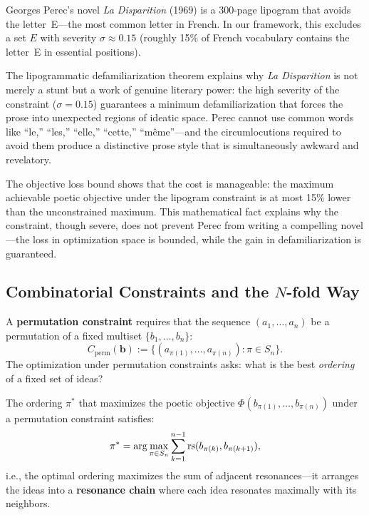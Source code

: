 \begin{interpretation}
\label{interp:lipogram}
Georges Perec's novel \textit{La Disparition} (1969) is a 300-page lipogram
that avoids the letter~E---the most common letter in French.  In our framework,
this excludes a set $E$ with severity $\sigma \approx 0.15$ (roughly 15\%
of French vocabulary contains the letter~E in essential positions).

The lipogrammatic defamiliarization theorem explains why \textit{La Disparition}
is not merely a stunt but a work of genuine literary power: the high severity
of the constraint ($\sigma = 0.15$) guarantees a minimum defamiliarization
that forces the prose into unexpected regions of ideatic space.  Perec cannot
use common words like ``le,'' ``les,'' ``elle,'' ``cette,'' ``m\^eme''---and
the circumlocutions required to avoid them produce a distinctive prose style
that is simultaneously awkward and revelatory.

The objective loss bound shows that the cost is manageable: the maximum
achievable poetic objective under the lipogram constraint is at most 15\%
lower than the unconstrained maximum.  This mathematical fact explains why
the constraint, though severe, does not prevent Perec from writing a
compelling novel---the loss in optimization space is bounded, while the
gain in defamiliarization is guaranteed.
\end{interpretation}

\subsection{Combinatorial Constraints and the $N$-fold Way}

\begin{definition}
\label{def:permutation-constraint}
A \textbf{permutation constraint} requires that the sequence
$(a_1, \ldots, a_n)$ be a permutation of a fixed multiset
$\{b_1, \ldots, b_n\}$:
\[
  C_{\text{perm}}(\mathbf{b}) :=
  \{(a_{\pi(1)}, \ldots, a_{\pi(n)}) : \pi \in S_n\}.
\]
The optimization under permutation constraints asks: what is the best
\emph{ordering} of a fixed set of ideas?
\end{definition}

\begin{theorem}
\label{thm:optimal-ordering}
The ordering $\pi^\ast$ that maximizes the poetic objective
$\Phi(b_{\pi(1)}, \ldots, b_{\pi(n)})$ under a permutation constraint
satisfies:
\[
  \pi^\ast = \arg\max_{\pi \in S_n}
  \sum_{k=1}^{n-1} \mathrm{rs}(b_{\pi(k)}, b_{\pi(k+1)}),
\]
i.e., the optimal ordering maximizes the sum of adjacent resonances---it
arranges the ideas into a \textbf{resonance chain} where each idea
resonates maximally with its neighbors.
\end{theorem}

